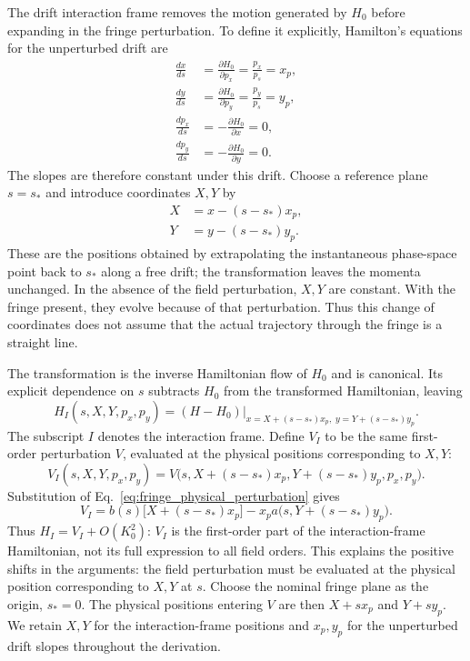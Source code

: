 The drift interaction frame removes the motion generated by $H_0$ before
expanding in the fringe perturbation. To define it explicitly, Hamilton's
equations for the unperturbed drift are
\begin{align}
 \frac{dx}{ds}&=\frac{\partial H_0}{\partial p_x}
              =\frac{p_x}{p_s}=x_p,\label{eq:fringe_drift_x}\\
 \frac{dy}{ds}&=\frac{\partial H_0}{\partial p_y}
              =\frac{p_y}{p_s}=y_p,\label{eq:fringe_drift_y}\\
 \frac{dp_x}{ds}&=-\frac{\partial H_0}{\partial x}=0,\\
 \frac{dp_y}{ds}&=-\frac{\partial H_0}{\partial y}=0.
\end{align}
The slopes are therefore constant under this drift. Choose a reference
plane $s=s_*$ and introduce coordinates $X,Y$ by
\begin{align}
 X&=x-(s-s_*)x_p,\label{eq:fringe_interaction_x}\\
 Y&=y-(s-s_*)y_p.\label{eq:fringe_interaction_y}
\end{align}
These are the positions obtained by extrapolating the instantaneous
phase-space point back to $s_*$ along a free drift; the transformation leaves
the momenta unchanged. In the absence of the field perturbation, $X,Y$ are
constant. With the fringe present, they evolve because of that perturbation.
Thus this change of coordinates does not assume that the actual trajectory
through the fringe is a straight line.

The transformation is the inverse Hamiltonian flow of $H_0$ and is
canonical. Its explicit dependence on $s$ subtracts $H_0$ from the
transformed Hamiltonian, leaving
\begin{equation}
 H_I(s,X,Y,p_x,p_y)
 =\left.(H-H_0)\right|_{x=X+(s-s_*)x_p,\;y=Y+(s-s_*)y_p}.
\end{equation}
The subscript $I$ denotes the interaction frame. Define $V_I$ to be the
same first-order perturbation $V$, evaluated at the physical positions
corresponding to $X,Y$:
\begin{equation}
 V_I(s,X,Y,p_x,p_y)
 =V\bigl(s,X+(s-s_*)x_p,Y+(s-s_*)y_p,p_x,p_y\bigr).
\end{equation}
Substitution of Eq.~\eqref{eq:fringe_physical_perturbation} gives
\begin{equation}
 V_I=b(s)\bigl[X+(s-s_*)x_p\bigr]
     -x_p a\bigl(s,Y+(s-s_*)y_p\bigr).
 \label{eq:fringe_interaction_perturbation}
\end{equation}
Thus $H_I=V_I+O(K_0^2)$: $V_I$ is the first-order part of the
interaction-frame Hamiltonian, not its full expression to all field orders.
This explains the positive shifts in the arguments: the field perturbation
must be evaluated at the physical position corresponding to $X,Y$ at $s$.
Choose the nominal fringe plane as the origin, $s_*=0$. The physical
positions entering $V$ are then $X+s x_p$ and $Y+s y_p$.
We retain $X,Y$ for the interaction-frame positions and $x_p,y_p$
for the unperturbed drift slopes throughout the derivation.

